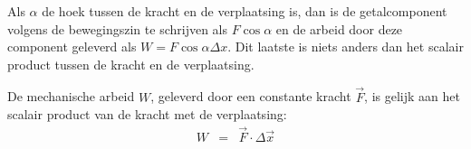 \documentclass{ximera}
\begin{document}
	Als $\alpha$ de hoek tussen de kracht en de verplaatsing is, dan is de getalcomponent volgens de bewegingszin te schrijven als $F\cos{\alpha}$ en de arbeid door deze component geleverd als $W=F\cos{\alpha}\Delta x$. Dit laatste is niets anders dan het scalair product tussen de kracht en de verplaatsing.
	
	De mechanische arbeid $W$, geleverd door een constante kracht $\vec{F}$, is gelijk aan het scalair product van de kracht met de verplaatsing:
	\begin{eqnarray}
	W&=&\vec{F}\cdot\Delta\vec{x}
	\end{eqnarray}
	
	
	
	
	
\end{document}
